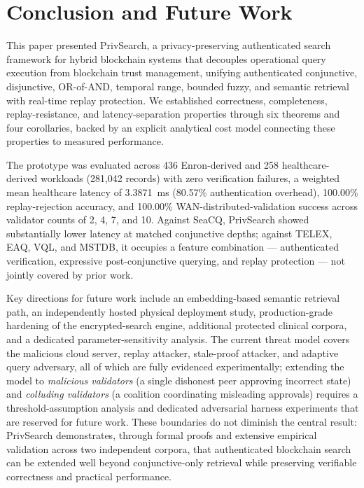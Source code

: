 \section{Conclusion and Future Work}
\label{sec:conclusion}

This paper presented PrivSearch, a privacy-preserving authenticated search framework for hybrid blockchain systems that decouples operational query execution from blockchain trust management, unifying authenticated conjunctive, disjunctive, OR-of-AND, temporal range, bounded fuzzy, and semantic retrieval with real-time replay protection. We established correctness, completeness, replay-resistance, and latency-separation properties through six theorems and four corollaries, backed by an explicit analytical cost model connecting these properties to measured performance.

The prototype was evaluated across 436 Enron-derived and 258 healthcare-derived workloads (281,042 records) with zero verification failures, a weighted mean healthcare latency of 3.3871~ms (80.57\% authentication overhead), 100.00\% replay-rejection accuracy, and 100.00\% WAN-distributed-validation success across validator counts of 2, 4, 7, and 10. Against SeaCQ, PrivSearch showed substantially lower latency at matched conjunctive depths; against TELEX, EAQ, VQL, and MSTDB, it occupies a feature combination --- authenticated verification, expressive post-conjunctive querying, and replay protection --- not jointly covered by prior work.

Key directions for future work include an embedding-based semantic retrieval path, an independently hosted physical deployment study, production-grade hardening of the encrypted-search engine, additional protected clinical corpora, and a dedicated parameter-sensitivity analysis. The current threat model covers the malicious cloud server, replay attacker, stale-proof attacker, and adaptive query adversary, all of which are fully evidenced experimentally; extending the model to \emph{malicious validators} (a single dishonest peer approving incorrect state) and \emph{colluding validators} (a coalition coordinating misleading approvals) requires a threshold-assumption analysis and dedicated adversarial harness experiments that are reserved for future work. These boundaries do not diminish the central result: PrivSearch demonstrates, through formal proofs and extensive empirical validation across two independent corpora, that authenticated blockchain search can be extended well beyond conjunctive-only retrieval while preserving verifiable correctness and practical performance.
